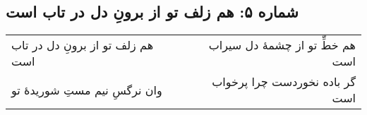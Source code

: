 \begin{center}
\section*{شماره ۵: هم زلف تو از برونِ دل در تاب است}
\label{sec:005}
\begin{longtable}{l p{0.5cm} r}
هم زلف تو از برونِ دل در تاب است
&&
هم خطِّ تو از چشمهٔ دل سیراب است
\\
وان نرگسِ نیم مستِ شوریدهٔ تو
&&
گر باده نخوردست چرا پرخواب است
\\
\end{longtable}
\end{center}
